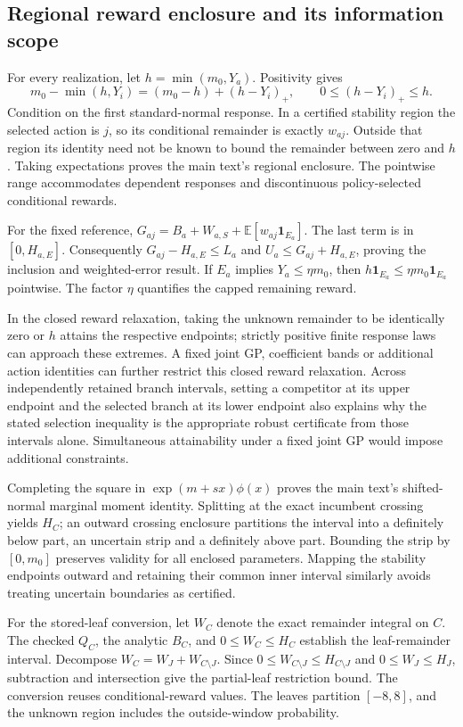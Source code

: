 \subsection{Regional reward enclosure and its information scope}\label{sec:supp_regional_proof}

For every realization, let $h=\min(m_0,Y_a)$. Positivity gives
\[
m_0-\min(h,Y_i)=(m_0-h)+(h-Y_i)_+,
\qquad 0\le(h-Y_i)_+\le h.
\]
Condition on the first standard-normal response. In a certified stability region the selected action is $j$, so its conditional remainder is exactly $w_{aj}$. Outside that region its identity need not be known to bound the remainder between zero and $h$. Taking expectations proves the main text's regional enclosure. The pointwise range accommodates dependent responses and discontinuous policy-selected conditional rewards.

For the fixed reference, $G_{aj}=B_a+W_{a,S}+\mathbb E[w_{aj}\mathbf1_{E_a}]$. The last term is in $[0,H_{a,E}]$. Consequently $G_{aj}-H_{a,E}\le L_a$ and $U_a\le G_{aj}+H_{a,E}$, proving the inclusion and weighted-error result. If $E_a$ implies $Y_a\le\eta m_0$, then $h\mathbf1_{E_a}\le\eta m_0\mathbf1_{E_a}$ pointwise. The factor $\eta$ quantifies the capped remaining reward.

In the closed reward relaxation, taking the unknown remainder to be identically zero or $h$ attains the respective endpoints; strictly positive finite response laws can approach these extremes. A fixed joint GP, coefficient bands or additional action identities can further restrict this closed reward relaxation. Across independently retained branch intervals, setting a competitor at its upper endpoint and the selected branch at its lower endpoint also explains why the stated selection inequality is the appropriate robust certificate from those intervals alone. Simultaneous attainability under a fixed joint GP would impose additional constraints.

Completing the square in $\exp(m+sx)\phi(x)$ proves the main text's shifted-normal marginal moment identity. Splitting at the exact incumbent crossing yields $H_C$; an outward crossing enclosure partitions the interval into a definitely below part, an uncertain strip and a definitely above part. Bounding the strip by $[0,m_0]$ preserves validity for all enclosed parameters. Mapping the stability endpoints outward and retaining their common inner interval similarly avoids treating uncertain boundaries as certified.

For the stored-leaf conversion, let $W_C$ denote the exact remainder integral on $C$. The checked $Q_C$, the analytic $B_C$, and $0\le W_C\le H_C$ establish the leaf-remainder interval. Decompose $W_C=W_J+W_{C\setminus J}$. Since $0\le W_{C\setminus J}\le H_{C\setminus J}$ and $0\le W_J\le H_J$, subtraction and intersection give the partial-leaf restriction bound. The conversion reuses conditional-reward values. The leaves partition $[-8,8]$, and the unknown region includes the outside-window probability.

